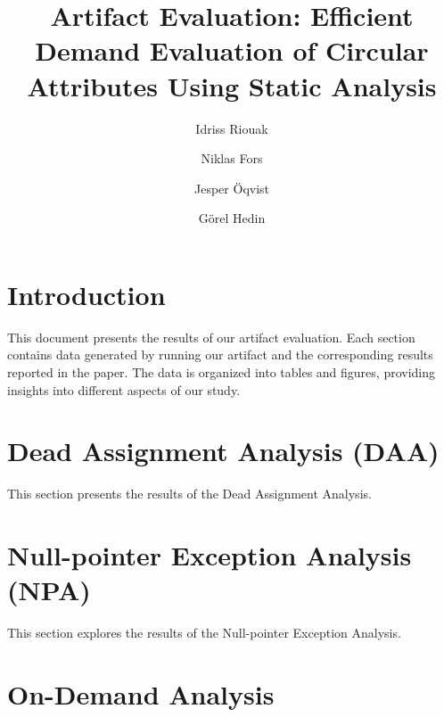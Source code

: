 \documentclass[acmsmall, screen, review, nonacm]{acmart}
\begin{document}
\title{Artifact Evaluation: Efficient Demand Evaluation of Circular Attributes Using Static Analysis}


\author{Idriss Riouak}
\author{Niklas Fors}
\author{Jesper {\"O}qvist}
\author{G{\"o}rel Hedin}



\renewcommand{\shortauthors}{Riouak et al.}


\maketitle

\section{Introduction}
This document presents the results of our artifact evaluation. Each section contains data generated by running our artifact and the corresponding results reported in the paper. The data is organized into tables and figures, providing insights into different aspects of our study.

\section{Dead Assignment Analysis (DAA)}
This section presents the results of the Dead Assignment Analysis.





\section{Null-pointer Exception Analysis (NPA)}
This section explores the results of the Null-pointer Exception Analysis.





\section{On-Demand Analysis}
\end{document}
